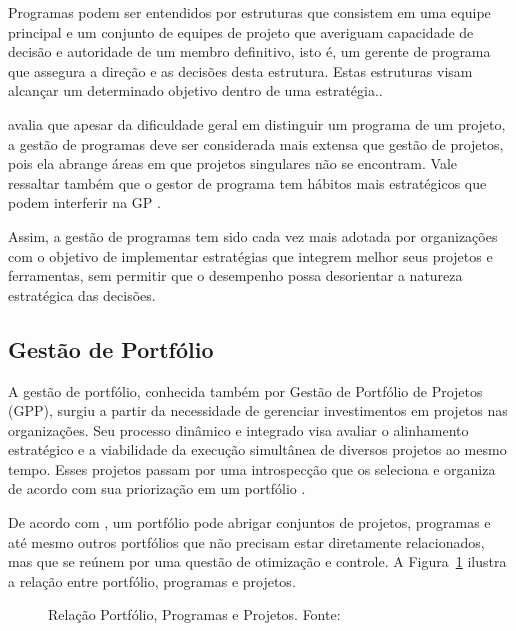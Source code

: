   Programas podem ser entendidos por estruturas que consistem em uma equipe principal e um conjunto de equipes de projeto que averiguam capacidade de decisão e autoridade de um membro definitivo, isto é, um gerente de programa que assegura a direção e as decisões desta estrutura. Estas estruturas visam alcançar um determinado objetivo dentro de uma estratégia.\cite{brown2008handbook}.

   avalia que apesar da dificuldade geral em distinguir um programa de um projeto, a gestão de programas deve ser considerada mais extensa que gestão de projetos, pois ela abrange áreas em que projetos singulares não se encontram. Vale ressaltar também que o gestor de programa tem hábitos mais estratégicos que podem interferir na GP \cite{lycett2004289}.

  Assim, a gestão de programas tem sido cada vez mais adotada por organizações com o objetivo de implementar estratégias que integrem melhor seus projetos e ferramentas, sem permitir que o desempenho possa desorientar a natureza estratégica das decisões.

\subsection{Gestão de Portfólio}

  A gestão de portfólio, conhecida também por Gestão de Portfólio de Projetos (GPP), surgiu a partir da necessidade de gerenciar investimentos em projetos nas organizações. Seu processo dinâmico e integrado visa avaliar o alinhamento estratégico e a viabilidade da execução simultânea de diversos projetos ao mesmo tempo. Esses projetos passam por uma introspecção que os seleciona e organiza de acordo com sua priorização em um portfólio \cite{meredith2011project, kerzner2013project}.

  De acordo com , um portfólio pode abrigar conjuntos de projetos, programas e até mesmo outros portfólios que não precisam estar diretamente relacionados, mas que se reúnem por uma questão de otimização e controle. A Figura~\ref{port_prog_proj} ilustra a relação entre portfólio, programas e projetos.

  \begin{figure}[ht]
    \centering
    \caption{Relação Portfólio, Programas e Projetos. Fonte: \cite{pmi2006}}
    \label{port_prog_proj}
  \end{figure}

